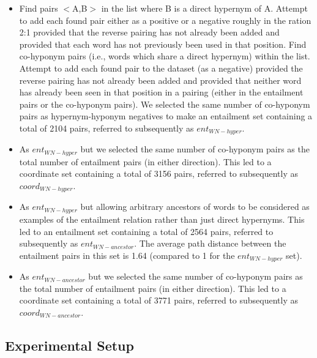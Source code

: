 \documentclass[11pt]{article}
\begin{document}
\begin{itemize}
\item Find pairs $<$A,B$>$ in the list where B is a direct hypernym of A.  Attempt to add each found pair either as a positive or a negative roughly in the ration 2:1 provided that the reverse pairing has not already been added and provided that each word has not previously been used in that position.  Find co-hyponym pairs (i.e., words which share a direct hypernym) within the list.  Attempt to add each found pair to the dataset (as a negative) provided the reverse pairing has not already been added and provided that neither word has already been seen in that position in a pairing (either in the entailment pairs or the co-hyponym pairs).  We selected the same number of co-hyponym pairs as hypernym-hyponym negatives to make an entailment set containing a total of 2104 pairs, referred to subsequently as $ent_{WN-hyper}$.
\item As $ent_{WN-hyper}$ but we selected the same number of co-hyponym pairs as the total number of entailment pairs (in either direction).  This led to a coordinate set containing a total of 3156 pairs, referred to subsequently as $coord_{WN-hyper}$.
\item As $ent_{WN-hyper}$ but allowing arbitrary ancestors of words to be considered as examples of the entailment relation rather than just direct hypernyms.  This led to an entailment set containing a total of 2564 pairs, referred to subsequently as $ent_{WN-ancestor}$.  The average path distance between the entailment pairs in this set is 1.64 (compared to 1 for the $ent_{WN-hyper}$ set).
\item As $ent_{WN-ancestor}$ but we selected the same number of co-hyponym pairs as the total number of entailment pairs (in either direction).  This led to a coordinate set containing a total of 3771 pairs, referred to subsequently as $coord_{WN-ancestor}$.
\end{itemize}

\subsection{Experimental Setup}
\end{document}
